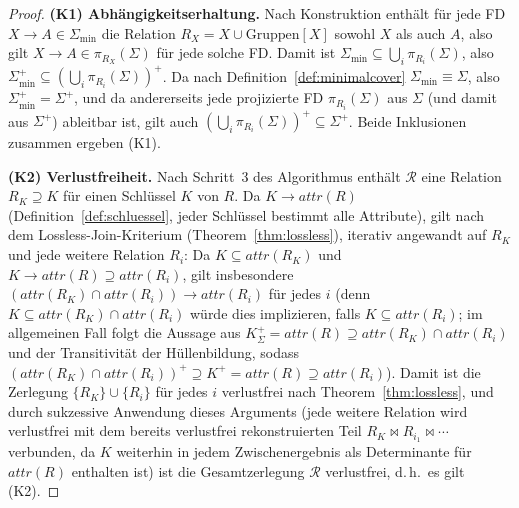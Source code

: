 ﻿\documentclass[a4paper,12pt]{report}
\theoremstyle{definition}
\theoremstyle{remark}
\newcommand{\att}{\mathit{attr}}
\begin{document}
\begin{proof}
\textbf{(K1) Abhängigkeitserhaltung.}
Nach Konstruktion enthält für jede FD $X\to A\in\Sigma_{\min}$ die
Relation $R_X=X\cup\text{Gruppen}[X]$ sowohl $X$ als auch $A$, also
gilt $X\to A \in \pi_{R_X}(\Sigma)$ für jede solche FD. Damit ist
$\Sigma_{\min}\subseteq\bigcup_i\pi_{R_i}(\Sigma)$, also
$\Sigma_{\min}^+\subseteq(\bigcup_i\pi_{R_i}(\Sigma))^+$. Da nach
Definition~\ref{def:minimalcover} $\Sigma_{\min}\equiv\Sigma$, also
$\Sigma_{\min}^+=\Sigma^+$, und da andererseits jede projizierte FD
$\pi_{R_i}(\Sigma)$ aus $\Sigma$ (und damit aus $\Sigma^+$) ableitbar
ist, gilt auch
$(\bigcup_i\pi_{R_i}(\Sigma))^+\subseteq\Sigma^+$. Beide Inklusionen
zusammen ergeben (K1).

\textbf{(K2) Verlustfreiheit.}
Nach Schritt~3 des Algorithmus enthält $\mathcal{R}$ eine Relation
$R_K\supseteq K$ für einen Schlüssel $K$ von $R$. Da $K\to\att(R)$
(Definition~\ref{def:schluessel}, jeder Schlüssel bestimmt alle
Attribute), gilt nach dem Lossless-Join-Kriterium
(Theorem~\ref{thm:lossless}), iterativ angewandt auf
$R_K$ und jede weitere Relation $R_i$: Da $K\subseteq\att(R_K)$ und
$K\to\att(R)\supseteq\att(R_i)$, gilt insbesondere
$(\att(R_K)\cap\att(R_i))\to\att(R_i)$ für jedes $i$ (denn
$K\subseteq\att(R_K)\cap\att(R_i)$ würde dies implizieren, falls
$K\subseteq \att(R_i)$; im allgemeinen Fall folgt die Aussage aus
$K^+_\Sigma=\att(R)\supseteq \att(R_K)\cap\att(R_i)$ und der
Transitivität der Hüllenbildung, sodass
$(\att(R_K)\cap\att(R_i))^+\supseteq K^+=\att(R)\supseteq\att(R_i)$).
Damit ist die Zerlegung $\{R_K\}\cup\{R_i\}$ für jedes $i$ verlustfrei
nach Theorem~\ref{thm:lossless}, und durch sukzessive Anwendung dieses
Arguments (jede weitere Relation wird verlustfrei mit dem bereits
verlustfrei rekonstruierten Teil $R_K\Join R_{i_1}\Join\cdots$
verbunden, da $K$ weiterhin in jedem Zwischenergebnis als
Determinante für $\att(R)$ enthalten ist) ist die Gesamtzerlegung
$\mathcal{R}$ verlustfrei, d.\,h.\ es gilt (K2).


\end{proof}
\end{document}
